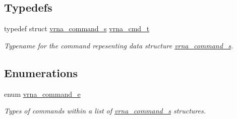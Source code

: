 \subsection*{Typedefs}
\begin{DoxyCompactItemize}
\item 
\mbox{\label{group__file__utils_ga92cb3b5952352b103bcb32e5a99e0e5a}} 
typedef struct \hyperlink{group__file__utils_structvrna__command__s}{vrna\+\_\+command\+\_\+s} \hyperlink{group__file__utils_ga92cb3b5952352b103bcb32e5a99e0e5a}{vrna\+\_\+cmd\+\_\+t}
\begin{DoxyCompactList}\small\item\em Typename for the command repesenting data structure \hyperlink{group__file__utils_structvrna__command__s}{vrna\+\_\+command\+\_\+s}. \end{DoxyCompactList}\end{DoxyCompactItemize}
\subsection*{Enumerations}
\begin{DoxyCompactItemize}
\item 
\mbox{\label{group__file__utils_ga2ea3e452bf3b3f3ca513b3b081a86137}} 
enum \hyperlink{group__file__utils_ga2ea3e452bf3b3f3ca513b3b081a86137}{vrna\+\_\+command\+\_\+e} \begin{DoxyCompactList}\small\item\em Types of commands within a list of \hyperlink{group__file__utils_structvrna__command__s}{vrna\+\_\+command\+\_\+s} structures. \end{DoxyCompactList}
\end{DoxyCompactItemize}
